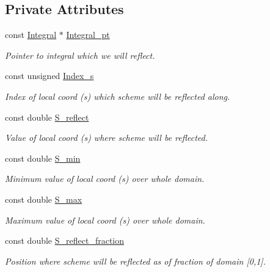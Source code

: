 \subsection*{Private Attributes}
\begin{DoxyCompactItemize}
\item 
const \hyperlink{classoomph_1_1Integral}{Integral} $\ast$ \hyperlink{classoomph_1_1ReflectedIntegral_ae1f3c64912a966f525f1c731cf78f9ef}{Integral\+\_\+pt}
\begin{DoxyCompactList}\small\item\em Pointer to integral which we will reflect. \end{DoxyCompactList}\item 
const unsigned \hyperlink{classoomph_1_1ReflectedIntegral_af0174c09605e1c073b719e65b3922257}{Index\+\_\+s}
\begin{DoxyCompactList}\small\item\em Index of local coord (s) which scheme will be reflected along. \end{DoxyCompactList}\item 
const double \hyperlink{classoomph_1_1ReflectedIntegral_a9f279264ea2f217727ecef0f911c4dc8}{S\+\_\+reflect}
\begin{DoxyCompactList}\small\item\em Value of local coord (s) where scheme will be reflected. \end{DoxyCompactList}\item 
const double \hyperlink{classoomph_1_1ReflectedIntegral_a9284add785f137dc8a9fe67ffee61a8a}{S\+\_\+min}
\begin{DoxyCompactList}\small\item\em Minimum value of local coord (s) over whole domain. \end{DoxyCompactList}\item 
const double \hyperlink{classoomph_1_1ReflectedIntegral_a000d0b1a2ff6bdd496fa915f9949b39b}{S\+\_\+max}
\begin{DoxyCompactList}\small\item\em Maximum value of local coord (s) over whole domain. \end{DoxyCompactList}\item 
const double \hyperlink{classoomph_1_1ReflectedIntegral_a6a91bd7e0119b0132273a625d6dba6d0}{S\+\_\+reflect\+\_\+fraction}
\begin{DoxyCompactList}\small\item\em Position where scheme will be reflected as of fraction of domain \mbox{[}0,1\mbox{]}. \end{DoxyCompactList}\end{DoxyCompactItemize}


